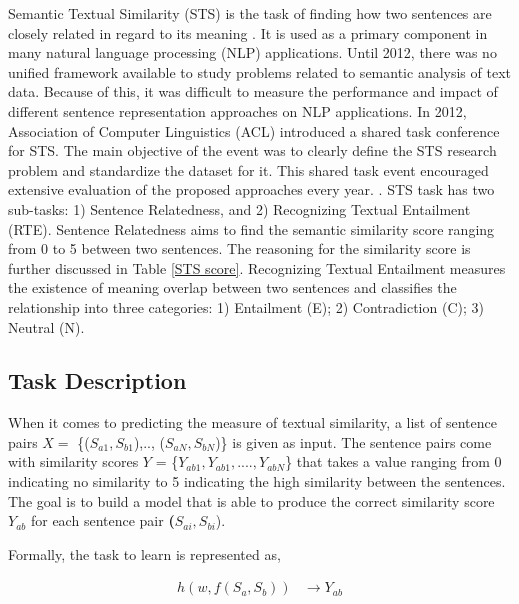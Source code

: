 \documentclass[12pt]{report} %
\begin{document}
Semantic Textual Similarity (STS) is the task of finding how two sentences are closely related in regard to its meaning \citep{agirre2012semeval}. It is used as a primary component in many natural language processing (NLP) applications. Until 2012, there was no unified framework available to study problems related to semantic analysis of text data. Because of this, it was difficult to measure the performance and impact of different sentence representation approaches on NLP applications. In 2012, Association of Computer Linguistics (ACL) introduced a shared task conference for STS. The main objective of the event was to clearly define the STS research problem and standardize the dataset for it. This shared task event encouraged extensive evaluation of the proposed approaches every year. \citep{agirre2012semeval}. STS task has two sub-tasks: 1) Sentence Relatedness, and 2) Recognizing Textual Entailment (RTE). Sentence Relatedness aims to find the semantic similarity score ranging from 0 to 5 between two sentences. The reasoning for the similarity score is further discussed in Table \ref{STS score}. Recognizing Textual Entailment measures the existence of meaning overlap between two sentences and classifies the relationship into three categories: 1) Entailment (E); 2) Contradiction (C); 3) Neutral (N).

\subsection*{Task Description}

When it comes to predicting the measure of textual similarity, a list of sentence pairs $X =$ \{($S_{a1},S_{b1}$),.., ($S_{aN},S_{bN}$)\} is given as input. The sentence pairs come with similarity scores $Y$ = \{$Y_{ab1}, Y_{ab1},...., Y_{abN}$\} that takes a value ranging from 0 indicating no similarity to 5 indicating the high similarity between the sentences. The goal is to build a model that is able to produce the correct similarity score $Y_{ab}$ for each sentence pair \textbf($S_{ai},S_{bi}$).


Formally, the task to learn is represented as,

\begin{align} 
h(w,f(S_a,S_b))  & \rightarrow Y_{ab} 
\end{align}
\end{document}
